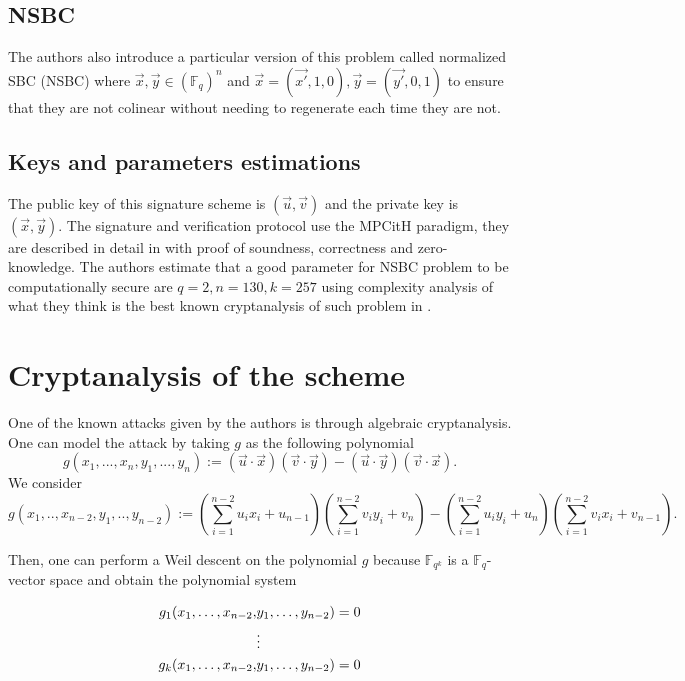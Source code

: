 \documentclass[english]{article}
\begin{document}
		\subsection{NSBC}
		
		The authors also introduce a particular version of this problem called normalized SBC (NSBC) where $\vec{x}, \vec{y} \in (\mathbb{F}_q)^n$ and
		$\vec{x} = (\vec{x'}, 1, 0), \vec{y} = (\vec{y'}, 0, 1)$ to ensure that they are not colinear without needing to regenerate each time they are not.
 		
 		\subsection{Keys and parameters estimations}
		The public key of this signature scheme is $(\vec{u},\vec{v})$ and the private key is $(\vec{x}, \vec{y})$.
		The signature and verification protocol use the MPCitH paradigm, they are described in detail in \cite{HJ23} with proof of soundness, correctness and zero-knowledge.
		The authors estimate that a good parameter for NSBC problem to be computationally secure are $q = 2, n = 130, k = 257$ using complexity analysis of what they think is the best known cryptanalysis of such problem in \cite{FSS11}.
		
		\section{Cryptanalysis of the scheme}
		One of the known attacks given by the authors is through algebraic cryptanalysis.
		One can model the attack by taking $g$ as the following polynomial
		$$
		g(x_1,...,x_n,y_1,...,y_n) := (\vec{u} \cdot \vec{x})(\vec{v} \cdot \vec{y}) - (\vec{u} \cdot \vec{y})(\vec{v} \cdot \vec{x}).
		$$
		We consider
		$$
		g(x_1,..,x_{n-2},y_1,..,y_{n-2}) := (\sum_{i = 1}^{n-2}u_{i}x_{i} + u_{n-1})(\sum_{i = 1}^{n-2}v_{i}y_{i} + v_{n}) - (\sum_{i = 1}^{n-2}u_{i}y_{i} + u_{n})(\sum_{i = 1}^{n-2}v_{i}x_{i} + v_{n-1}).
		$$
		
		Then, one can perform a Weil descent on the polynomial $g$ because $\mathbb{F}_{q^k}$ is a $\mathbb{F}_q$-vector space and obtain the polynomial system
		

		\begin{align}
			g_1(x_1, \dots, x_{n-2},& y_1, \dots, y_{n-2}) = 0 \notag \\
			&\vdots \notag \\
			g_k(x_1, \dots, x_{n-2},& y_1, \dots, y_{n-2}) = 0 \notag
		\end{align}
		
\end{document}
